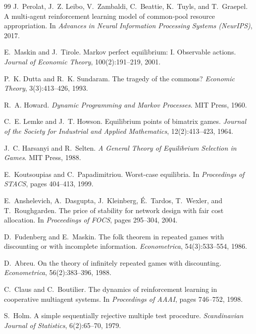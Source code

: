 \documentclass{article}
\begin{document}
{\begin{thebibliography}{99}
J.~Perolat, J.~Z. Leibo, V.~Zambaldi, C.~Beattie, K.~Tuyls, and T.~Graepel.
\newblock A multi-agent reinforcement learning model of common-pool resource appropriation.
\newblock In \textit{Advances in Neural Information Processing Systems (NeurIPS)}, 2017.

E.~Maskin and J.~Tirole.
\newblock Markov perfect equilibrium: I. Observable actions.
\newblock \textit{Journal of Economic Theory}, 100(2):191--219, 2001.

P.~K. Dutta and R.~K. Sundaram.
\newblock The tragedy of the commons?
\newblock \textit{Economic Theory}, 3(3):413--426, 1993.

R.~A. Howard.
\newblock \textit{Dynamic Programming and Markov Processes}.
\newblock MIT Press, 1960.

C.~E. Lemke and J.~T. Howson.
\newblock Equilibrium points of bimatrix games.
\newblock \textit{Journal of the Society for Industrial and Applied Mathematics}, 12(2):413--423, 1964.

J.~C. Harsanyi and R.~Selten.
\newblock \textit{A General Theory of Equilibrium Selection in Games}.
\newblock MIT Press, 1988.

E.~Koutsoupias and C.~Papadimitriou.
\newblock Worst-case equilibria.
\newblock In \textit{Proceedings of STACS}, pages 404--413, 1999.

E.~Anshelevich, A.~Dasgupta, J.~Kleinberg, {\'E}.~Tardos, T.~Wexler, and T.~Roughgarden.
\newblock The price of stability for network design with fair cost allocation.
\newblock In \textit{Proceedings of FOCS}, pages 295--304, 2004.

D.~Fudenberg and E.~Maskin.
\newblock The folk theorem in repeated games with discounting or with incomplete information.
\newblock \textit{Econometrica}, 54(3):533--554, 1986.

D.~Abreu.
\newblock On the theory of infinitely repeated games with discounting.
\newblock \textit{Econometrica}, 56(2):383--396, 1988.

C.~Claus and C.~Boutilier.
\newblock The dynamics of reinforcement learning in cooperative multiagent systems.
\newblock In \textit{Proceedings of AAAI}, pages 746--752, 1998.

S.~Holm.
\newblock A simple sequentially rejective multiple test procedure.
\newblock \textit{Scandinavian Journal of Statistics}, 6(2):65--70, 1979.

\end{thebibliography}
}
\end{document}
